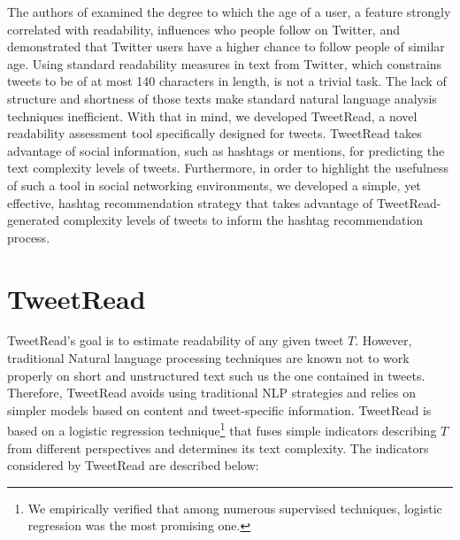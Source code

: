\documentclass{sig-alternate-05-2015}
\begin{document}
The authors of \cite{age} examined the degree to which the age of a user, a feature strongly correlated with readability, influences who people follow on Twitter, and demonstrated that Twitter users have a higher chance to follow people of similar age.
Using standard readability measures in text from Twitter, which constrains tweets to be of at most 140 characters in length, is not a trivial task. The lack of structure and shortness of those texts make standard natural language analysis techniques inefficient. With that in mind, we developed TweetRead, a novel readability assessment tool specifically designed for tweets. TweetRead takes advantage of social information, such as hashtags or mentions, for predicting the text complexity levels of tweets. Furthermore, in order to highlight the usefulness of such a tool in social networking environments, we developed a simple, yet effective, hashtag recommendation strategy that takes advantage of TweetRead-generated complexity levels of tweets to inform the hashtag recommendation process. 


\section{TweetRead}
TweetRead's goal is to estimate readability of any given tweet $T$. However, traditional Natural language processing techniques are known not to work properly on short and unstructured text such us the one contained in tweets. Therefore, TweetRead avoids using traditional NLP strategies and relies on simpler models based on content and tweet-specific information.  TweetRead is based on a logistic regression technique\footnote{We empirically verified that among numerous supervised techniques, logistic regression was the most promising one.} that fuses simple indicators describing $T$ from different perspectives and determines its text complexity. The indicators considered by TweetRead are described below:
\end{document}
